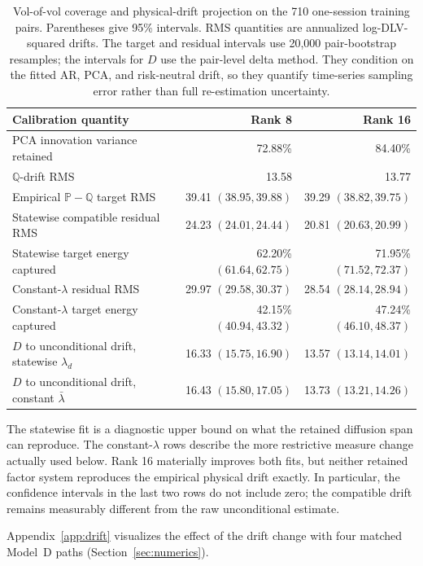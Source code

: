 \documentclass[11pt]{article}
\newcommand{\Q}{\mathbb Q}
\newcommand{\PP}{\mathbb P}
\theoremstyle{plain}
\theoremstyle{definition}
\theoremstyle{remark}
\begin{document}
\begin{table}[H]
\centering
\small
\begin{tabular}{lrr}
\toprule
Calibration quantity & Rank 8 & Rank 16\\
\midrule
PCA innovation variance retained & 72.88\% & 84.40\%\\
$\Q$-drift RMS & 13.58 & 13.77\\
Empirical $\PP-\Q$ target RMS
  & 39.41 $(38.95,39.88)$ & 39.29 $(38.82,39.75)$\\
Statewise compatible residual RMS
  & 24.23 $(24.01,24.44)$ & 20.81 $(20.63,20.99)$\\
Statewise target energy captured
  & 62.20\% $(61.64,62.75)$ & 71.95\% $(71.52,72.37)$\\
Constant-$\lambda$ residual RMS
  & 29.97 $(29.58,30.37)$ & 28.54 $(28.14,28.94)$\\
Constant-$\lambda$ target energy captured
  & 42.15\% $(40.94,43.32)$ & 47.24\% $(46.10,48.37)$\\
$D$ to unconditional drift, statewise $\lambda_d$
  & 16.33 $(15.75,16.90)$ & 13.57 $(13.14,14.01)$\\
$D$ to unconditional drift, constant $\bar\lambda$
  & 16.43 $(15.80,17.05)$ & 13.73 $(13.21,14.26)$\\
\bottomrule
\end{tabular}
\caption{Vol-of-vol coverage and physical-drift projection on the 710
one-session training pairs.  Parentheses give 95\% intervals.  RMS quantities
are annualized log-DLV-squared drifts.  The target and residual intervals use
20,000 pair-bootstrap resamples; the intervals for $D$ use the pair-level
delta method.  They condition on the fitted AR, PCA, and risk-neutral drift,
so they quantify time-series sampling error rather than full re-estimation
uncertainty.}
\label{tab:numerics-calibration}
\end{table}

The statewise fit is a diagnostic upper bound on what the retained diffusion
span can reproduce.  The constant-$\lambda$ rows describe the more restrictive
measure change actually used below.  Rank 16 materially improves both fits,
but neither retained factor system reproduces the empirical physical drift
exactly.  In particular, the confidence intervals in the last two rows do not
include zero; the compatible drift remains measurably different from the raw
unconditional estimate.

Appendix~\ref{app:drift} visualizes the effect of the drift change
with four matched Model~D paths (Section~\ref{sec:numerics}).  
\end{document}
